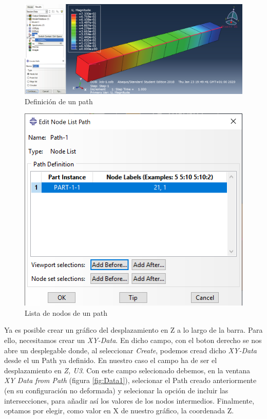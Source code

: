 \documentclass[spanish,a4paper,12pt]{article}
\begin{document}
\begin{figure}[h!tp]
\centering
\includegraphics[scale=0.75]{capturas/path.pdf}
\caption{Definición de un path}
\label{fig:path}%
\end{figure}
\clearpage

\begin{figure}[h!tp]
\centering
\includegraphics[scale=0.55]{capturas/path2.png}
\caption{Lista de nodos de un path}
\label{fig:path2}%
\end{figure}

Ya es posible crear un gráfico del desplazamiento en Z a lo largo de la barra. Para ello, necesitamos crear un \emph{XY-Data}. En dicho campo, con el boton derecho se nos abre un desplegable donde, al seleccionar \emph{Create}, podemos cread dicho \emph{XY-Data} desde el un Path ya definido. En nuestro caso el campo ha de ser el desplazamiento en \emph{Z, U3}. Con este campo selecionado debemos, en la ventana \emph{XY Data from Path} (figura \ref{fig:Data1}), selecionar el Path creado anteriormente (en su configuración no deformada) y selecionar la opción de incluir las intersecciones, para añadir así los valores de los nodos intermedios. Finalmente, optamos por elegir, como valor en X de nuestro gráfico, la coordenada Z.
\end{document}
